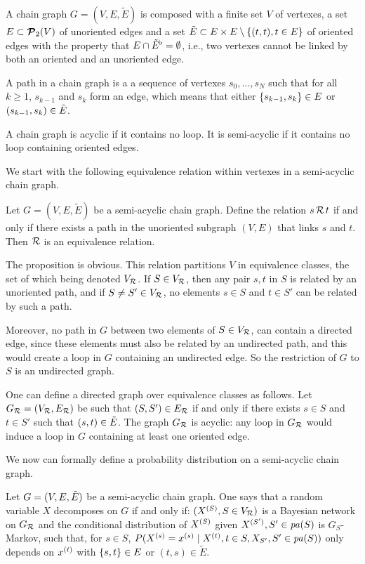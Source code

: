 \begin{definition}
\label{def:ch.grph}
A chain graph $G = (V,E, \tilde E)$ is composed with a finite set $V$
of vertexes, a set $E\subset {\bm{{\mathcal P}}}_2(V)$ of unoriented edges and a set
${\tilde{E}}\subset E\times E \setminus \left\{ (t,t), t\in E \right\}$ of oriented edges with
the property that $E \cap {\tilde{E}}^\flat=\emptyset$, i.e., two vertexes cannot
be linked by both an oriented and an unoriented edge.

A path in a chain graph is a a sequence of vertexes $s_0,
\ldots, s_N$ such that for all $k\geq 1$, $s_{k-1}$ and $s_k$ form an
edge, which means that either $\left\{ s_{k-1}, s_k \right\}\in E$ or
$(s_{k-1}, s_k) \in {\tilde{E}}$. 

A chain graph is acyclic if it contains no loop. It is semi-acyclic if
it contains no loop containing oriented edges.
\end{definition}
 
We start with the following equivalence relation within vertexes in a semi-acyclic
chain graph.

\begin{proposition}
Let $G = (V,E, \tilde E)$ be a semi-acyclic chain graph. Define the
relation $s\,{\mathcal R}\, t$ if and only if
there exists a path in the unoriented subgraph $(V,E)$ that links $s$
and $t$. Then ${\mathcal R}$ is an equivalence relation.
\end{proposition}

The proposition is obvious. This relation partitions $V$ in
equivalence classes, the set
of which being denoted $V_{\mathcal R}$. If $S\in V_{\mathcal R}$, then any pair $s,
t$ in $S$ is related by an unoriented path, and if $S\neq S'\in
V_{\mathcal R}$, no elements $s\in S$ and $t\in S'$ can be related by such a
path.

Moreover, no path in $G$ between two elements of $S\in
V_{\mathcal R}$, can contain a directed edge,  since these elements must also be related by an undirected
path, and this would create a loop in $G$ containing an undirected edge. So the restriction of $G$
to $S$ is an undirected graph. 

One can define a directed graph over equivalence classes as follows. Let $G_{\mathcal R} =
(V_{\mathcal R}, E_{\mathcal R})$ be such that
$(S,S') \in E_{\mathcal R}$ if and only if there exists $s\in S$ and $t\in
S'$ such that $(s,t)\in{\tilde{E}}$. The graph $G_{\mathcal R}$ is acyclic: any loop in $G_{\mathcal R}$
would induce a loop in $G$ containing at least one oriented edge.

We now can formally define a probability distribution on a semi-acyclic chain graph.
\begin{definition}
\label{def:acg}
Let $G = (V, E, {\tilde{E}})$ be a semi-acyclic chain graph. One says that a random variable
$X$ decomposes on $G$ if and only if: $(X^{(S)}, S\in V_{\mathcal R})$ is
a Bayesian network on $G_{\mathcal R}$ and the conditional distribution of
$X^{(S)}$ given $X^{(S')}, S'\in {\mathit{pa}(S)}$ is $G_S$-Markov, such that, for $s\in S$,
$P(X^{(s)} = x^{(s)}\mid X^{(t)}, t\in S, X_{S'}, S'\in {\mathit{pa}(S)})$ only depends on $x^{(t)}$
with $\left\{ s,t \right\}\in E$ or $(t,s) \in \tilde E$.
\end{definition}


